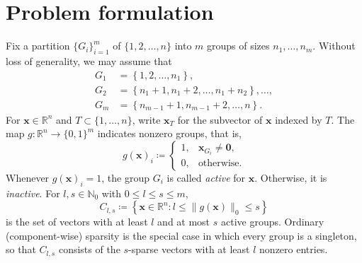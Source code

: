 \documentclass[11pt,a4paper]{article}
\theoremstyle{plain}
\theoremstyle{definition}
\theoremstyle{remark}
\newcommand*{\vz}{\mathbf{0}}
\newcommand*\R{\mathbb{R}}
\newcommand*\N{\mathbb{N}}
\newcommand*\x{\mathbf{x}}
\begin{document}
\section{Problem formulation}
\label{sec:problem}

Fix a partition \(\{G_i\}_{i=1}^m\) of \(\{1,2,\ldots,n\}\) into \(m\) groups of sizes \(n_1,\ldots,n_m\).
Without loss of generality, we may assume that
\begin{align*}
  G_1 & = \left\{1,2, \ldots, n_1\right\}, \\ G_2 & = \left\{n_1+1, n_1+2, \ldots, n_1+n_2\right\}, \ldots, \\ G_m & = \left\{n_{m-1}+1, n_{m-1}+2, \ldots, n\right\}.
\end{align*}
For \(\x\in\R^n\) and \(T\subset \{1,\ldots,n\}\), write \(\x_T\) for the subvector of \(\x\) indexed by \(T\).
The map \(g: \R^n \to\{0,1\}^m\)
indicates nonzero groups, that is,
$$
  g(\x)_i\coloneqq \begin{cases}1, & \x_{G_i} \neq \vz, \\
             0, & \text{otherwise.}\end{cases}
$$
Whenever \(g(\x)_i=1\), the group \(G_i\) is called \emph{active} for \(\x\).
Otherwise, it is \emph{inactive}.
For \(l,s\in \N_0\) with \(0 \leq l\leq s\leq m\), $$ C_{l,s}\coloneqq\left\{\x \in \R^n:l\leq\|g(\x)\|_0 \leq s\right\} $$ is the set of vectors with at least \(l\) and at most \(s\) active groups.
Ordinary (component-wise) sparsity is the special case in which every group is a singleton, so that \(C_{l,s}\) consists of the \(s\)-sparse vectors with at least \(l\) nonzero entries.
\end{document}
